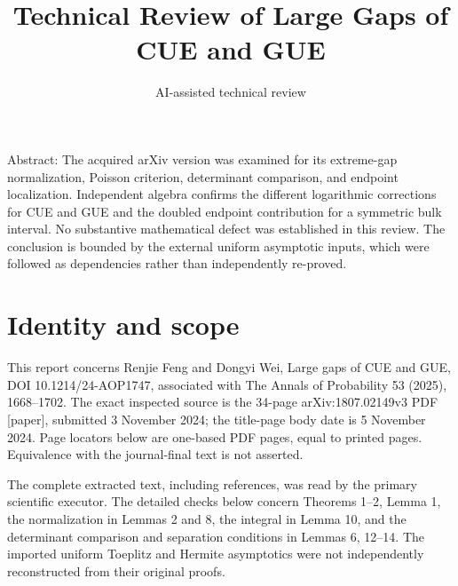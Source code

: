 \documentclass[10pt]{article}
\title{Technical Review of Large Gaps of CUE and GUE}
\author{AI-assisted technical review}
\date{}
\begin{document}
\maketitle
Abstract: The acquired arXiv version was examined for its extreme-gap normalization, Poisson criterion, determinant comparison, and endpoint localization. Independent algebra confirms the different logarithmic corrections for CUE and GUE and the doubled endpoint contribution for a symmetric bulk interval. No substantive mathematical defect was established in this review. The conclusion is bounded by the external uniform asymptotic inputs, which were followed as dependencies rather than independently re-proved.\par
\section*{Identity and scope}
This report concerns Renjie Feng and Dongyi Wei, Large gaps of CUE and GUE, DOI 10.1214/24-AOP1747, associated with The Annals of Probability 53 (2025), 1668–1702. The exact inspected source is the 34-page arXiv:1807.02149v3 PDF [paper], submitted 3 November 2024; the title-page body date is 5 November 2024. Page locators below are one-based PDF pages, equal to printed pages. Equivalence with the journal-final text is not asserted.\par
The complete extracted text, including references, was read by the primary scientific executor. The detailed checks below concern Theorems 1–2, Lemma 1, the normalization in Lemmas 2 and 8, the integral in Lemma 10, and the determinant comparison and separation conditions in Lemmas 6, 12–14. The imported uniform Toeplitz and Hermite asymptotics were not independently reconstructed from their original proofs.\par
\end{document}
